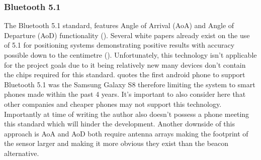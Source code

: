 \subsubsection{Bluetooth 5.1}
The Bluetooth 5.1 standard, features Angle of Arrival (AoA) and Angle of Departure (AoD) functionality (\cite{lehtimki_bluetooth}). Several white papers already exist on the use of 5.1 for positioning systems demonstrating positive results with accuracy possible down to the centimetre (\cite{lehtimki_bluetooth}). Unfortunately, this technology isn't applicable for the project goals due to it being relatively new many devices don't contain the chips required for this standard. \cite{svetlik_2018_bluetooth} quotes the first android phone to support Bluetooth 5.1 was the Samsung Galaxy S8 therefore limiting the system to smart phones made within the past 4 years. It's important to also consider here that other companies and cheaper phones may not support this technology. Importantly at time of writing the author also doesn't possess a phone meeting this standard which will hinder the development. Another downside of this approach is AoA and AoD both require antenna arrays making the footprint of the sensor larger and making it more obvious they exist than the beacon alternative.